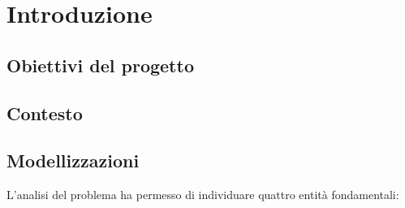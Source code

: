 \chapter{Introduzione}
\section{Obiettivi del progetto}

\section{Contesto}

\section{Modellizzazioni}
L'analisi del problema ha permesso di individuare quattro entità fondamentali:

